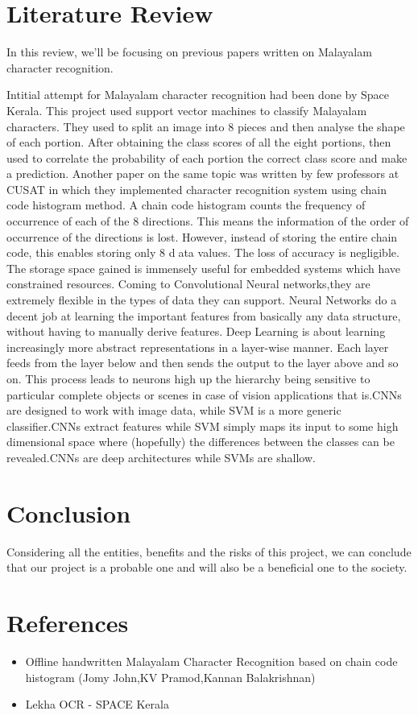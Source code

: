 \documentclass[12pt]{report}
\begin{document}
\section*{Literature Review}


 In this review, we'll be focusing on previous papers written on Malayalam character recognition. 

Intitial attempt for Malayalam character recognition had been done by Space Kerala. This project used support vector machines to classify Malayalam characters. They used to split an image into 8 pieces and then analyse the shape of each portion. After obtaining the class scores of all the eight portions, then used to correlate the probability of each portion the correct class score and make a prediction. Another paper on the same topic was written by few professors at CUSAT in which they implemented character recognition system using chain code histogram method. 
A chain code histogram counts the frequency of occurrence of each of the 8 directions. This means the information of the order of occurrence of the directions is lost. However, instead of storing the entire chain code, this enables storing only 8 data values.
The loss of accuracy is negligible. The storage space gained is immensely useful for embedded systems which have constrained resources. Coming to Convolutional Neural networks,they are extremely flexible in the types of data they can support. Neural Networks do a decent job at learning the important features from basically any data structure, without having to manually derive features. Deep Learning is about learning increasingly more abstract representations in a layer-wise manner. Each layer feeds from the layer below and then sends the output to the layer above and so on. This process leads to neurons high up the hierarchy being sensitive to particular complete objects or scenes in case of vision applications that is.CNNs are designed to work with image data, while SVM is a more generic classifier.CNNs extract features while SVM simply maps its input to some high dimensional space where (hopefully) the differences between the classes can be revealed.CNNs are deep architectures while SVMs are shallow.



\section*{Conclusion}


 Considering all the entities, benefits and the risks of this project, we can conclude that our project is a probable one and will also be a beneficial one to the society.



\section*{References}
\begin{itemize}
\item Offline handwritten Malayalam Character Recognition based on chain code histogram (Jomy John,KV Pramod,Kannan Balakrishnan)
\item Lekha OCR - SPACE Kerala
\end{itemize}
\end{document}
